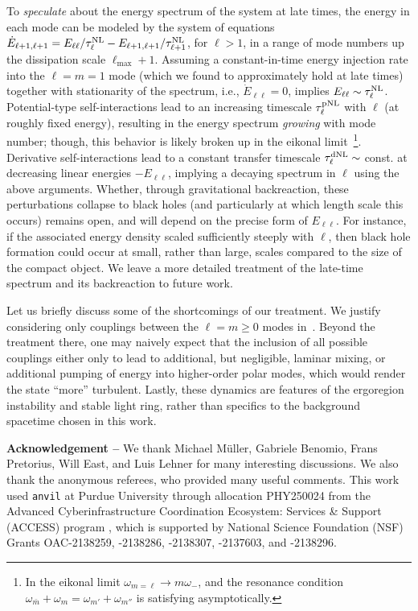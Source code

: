 \documentclass[aps,prl,notitlepage,superscriptaddress,twocolumn]{revtex4-1}
\newcommand{\red}[1]{{{#1}}}
\begin{document}
\red{To \textit{speculate} about the energy spectrum of the system at late times}, the energy in each mode can be modeled by the system of equations $\dot{E}_{\ell+1,\ell+1}=E_{\ell\ell}/\tau^{\rm NL}_{\ell}-E_{\ell+1,\ell+1}/\tau^{\rm NL}_{\ell+1}$, for $\ell>1$, in a range of mode numbers up the dissipation scale $\ell_{\max}+1$. Assuming a constant-in-time energy injection rate into the $\ell=m=1$ mode (which we found to approximately hold at late times) together with stationarity of the spectrum, i.e., $\dot{E}_{\ell\ell}=0$, implies $E_{\ell\ell}\sim\tau^{\rm NL}_{\ell}$. Potential-type self-interactions lead to an increasing timescale $\tau^{\rm pNL}_\ell$ with $\ell$ (at roughly fixed energy), resulting in the energy spectrum \textit{growing} with mode number; though, this behavior is likely broken up in the eikonal limit~\footnote{In the eikonal limit $\omega_{m=\ell}\rightarrow m\omega_-$, and the resonance condition $\omega_{\bar{m}}+\omega_m=\omega_{m'}+\omega_{m''}$ is satisfying asymptotically.}. Derivative self-interactions lead to a constant transfer timescale $\tau^{\rm dNL}_\ell\sim$ const. at decreasing linear energies $-E_{\ell\ell}$, implying a decaying spectrum in $\ell$ using the above arguments. \red{ Whether, through gravitational backreaction, these perturbations collapse to black holes (and particularly at which length scale this occurs) remains open, and will depend on the precise form of $E_{\ell\ell}$. For instance, if the associated energy density scaled sufficiently steeply with $\ell$, then black hole formation could occur at small, rather than large, scales compared to the size of the compact object. We leave a more detailed treatment of the late-time spectrum and its backreaction to future work.}

Let us briefly discuss some of the shortcomings of our treatment. We justify considering only couplings between the $\ell=m\geq 0$ modes in~\cite{sm}. Beyond the treatment there, one may naively expect that the inclusion of all possible couplings either only to lead to additional, but negligible, laminar mixing, or additional pumping of energy into higher-order polar modes, which would render the state ``more'' turbulent. Lastly, these dynamics are features of the ergoregion instability and stable light ring, rather than specifics to the background spacetime chosen in this work.

\textbf{Acknowledgement --} We thank Michael Müller, Gabriele Benomio, Frans Pretorius, Will East, and Luis Lehner for many interesting discussions. We also thank the anonymous referees, who provided many useful comments. This work used \texttt{anvil} at Purdue University through allocation PHY250024 from the Advanced Cyberinfrastructure Coordination Ecosystem: Services \& Support (ACCESS) program \cite{access}, which is supported by National Science Foundation (NSF) Grants OAC-2138259, -2138286, -2138307, -2137603, and -2138296.
\end{document}
